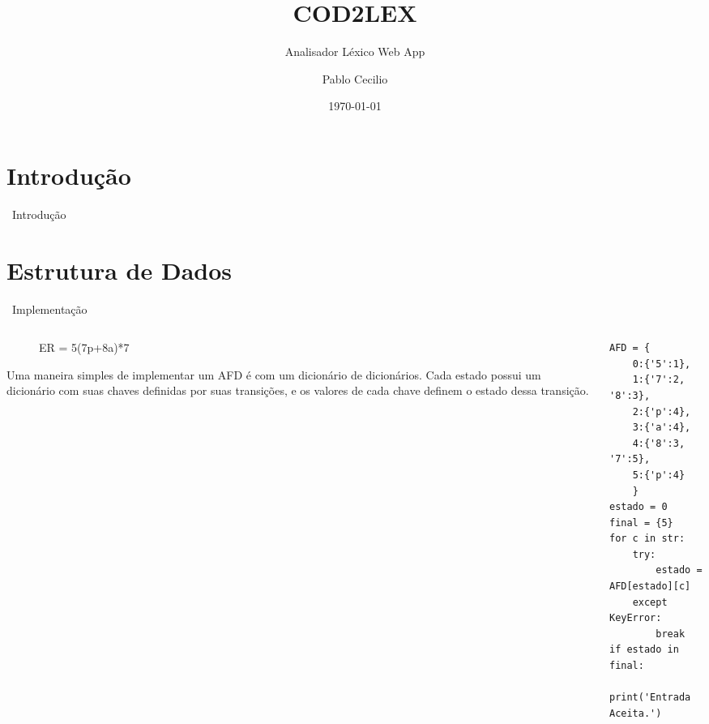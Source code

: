 \documentclass{beamer}
\title{COD2LEX}
\subtitle{Analisador Léxico Web App}
\author{Pablo Cecilio}
\date{\today}
\begin{document}
\begin{frame}
    \titlepage 
\end{frame}

\section{Introdução}
\begin{frame}{\raisebox{-0.2\height}{}~Introdução}

\end{frame}

\section{Estrutura de Dados}
\begin{frame}[fragile]{\raisebox{-0.2\height}{}~Implementação}
\vspace{-10mm}
\begin{columns}[t]
\begin{column}{0.45\textwidth}
   \begin{figure}
      \centering
      \caption{ER = 5(7p+8a)*7}
    \end{figure}
    \small \justifying Uma maneira simples de implementar um AFD é com um dicionário de dicionários. Cada estado possui um dicionário com suas chaves definidas por suas transições, e os valores de cada chave definem o estado dessa transição.
\end{column}
\begin{column}{0.45\textwidth}
\begin{verbatim}
AFD = {
    0:{'5':1},
    1:{'7':2, '8':3},
    2:{'p':4},
    3:{'a':4},
    4:{'8':3, '7':5},
    5:{'p':4}
    }
estado = 0
final = {5}
for c in str:
    try:
        estado = AFD[estado][c]
    except KeyError:
        break
if estado in final:
    print('Entrada Aceita.')
\end{verbatim}
\end{column}
\end{columns}
\end{frame}
\end{document}
